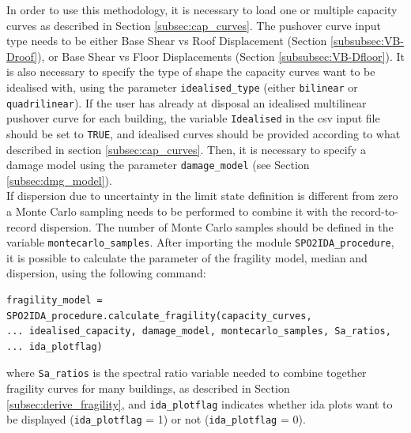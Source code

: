 In order to use this methodology, it is necessary to load one or multiple capacity curves as described in Section \ref{subsec:cap_curves}.
The pushover curve input type needs to be either Base Shear vs Roof Displacement (Section \ref{subsubsec:VB-Droof}), or Base Shear vs Floor Displacements (Section \ref{subsubsec:VB-Dfloor}). It is also necessary to specify the type of shape the capacity curves want to be idealised with, using the parameter \verb=idealised_type= (either \verb=bilinear= or \verb=quadrilinear=). If the user has already at disposal an idealised multilinear pushover curve for each building, the variable \verb=Idealised= in the csv input file should be set to \verb=TRUE=, and idealised curves should be provided according to what described in section \ref{subsec:cap_curves}. Then, it is necessary to specify a damage model using the parameter \verb=damage_model= (see Section \ref{subsec:dmg_model}).\\

If dispersion due to uncertainty in the limit state definition is different from zero a Monte Carlo sampling needs to be performed to combine it with the record-to-record dispersion. The number of Monte Carlo samples should be defined in the variable \verb=montecarlo_samples=.
After importing the module \verb=SPO2IDA_procedure=, it is possible to calculate the parameter of the fragility model, median and dispersion, using the following command:

\begin{Verbatim}[frame=single, commandchars=\\\{\}, samepage=true]
fragility_model = SPO2IDA_procedure.calculate_fragility(capacity_curves,
... idealised_capacity, damage_model, montecarlo_samples, Sa_ratios,
... ida_plotflag)
\end{Verbatim}

where \verb=Sa_ratios= is the spectral ratio variable needed to combine together fragility curves for many buildings, as described in Section \ref{subsec:derive_fragility}, and \verb=ida_plotflag= indicates whether ida plots want to be displayed (\verb=ida_plotflag= = 1) or not (\verb=ida_plotflag= = 0).